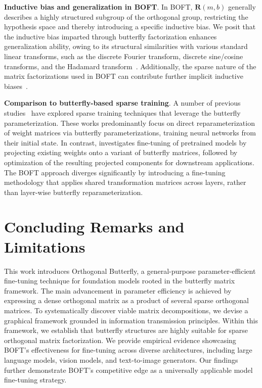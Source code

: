 \textbf{Inductive bias and generalization in BOFT}. In BOFT, $\bm{R}(m,b)$ generally describes a highly structured subgroup of the orthogonal group, restricting the hypothesis space and thereby introducing a specific inductive bias. We posit that the inductive bias imparted through butterfly factorization enhances generalization ability, owing to its structural similarities with various standard linear transforms, such as the discrete Fourier transform, discrete sine/cosine transforms, and the Hadamard transform~\cite{dao2019kaleidoscope}. Additionally, the sparse nature of the matrix factorizations used in BOFT can contribute further implicit inductive biases~\cite{gunasekar2017implicit,li2018algorithmic,liu2019neural}.

\textbf{Comparison to butterfly-based sparse training}. A number of previous studies~\cite{dao2019learning,dao2019kaleidoscope,chen2022pixelated,dao2022monarch} have explored sparse training techniques that leverage the butterfly parameterization. These works predominantly focus on direct reparameterization of weight matrices via butterfly parameterizations, training neural networks from their initial state. In contrast, \cite{dao2022monarch} investigates fine-tuning of pretrained models by projecting existing weights onto a variant of butterfly matrices, followed by optimization of the resulting projected components for downstream applications. The BOFT approach diverges significantly by introducing a fine-tuning methodology that applies shared transformation matrices across layers, rather than layer-wise butterfly reparameterization.



\section{Concluding Remarks and Limitations}

This work introduces Orthogonal Butterfly, a general-purpose parameter-efficient fine-tuning technique for foundation models rooted in the butterfly matrix framework. The main advancement in parameter efficiency is achieved by expressing a dense orthogonal matrix as a product of several sparse orthogonal matrices. To systematically discover viable matrix decompositions, we devise a graphical framework grounded in information transmission principles. Within this framework, we establish that butterfly structures are highly suitable for sparse orthogonal matrix factorization. We provide empirical evidence showcasing BOFT’s effectiveness for fine-tuning across diverse architectures, including large language models, vision models, and text-to-image generators. Our findings further demonstrate BOFT's competitive edge as a universally applicable model fine-tuning strategy.

